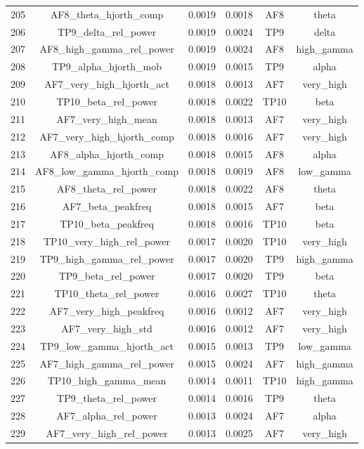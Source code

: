 \begin{table}[hptb]
\begin{table}
\begin{tabular}{cccccc}
205 & AF8_theta_hjorth_comp & 0.0019 & 0.0018 & AF8 & theta \\
206 & TP9_delta_rel_power & 0.0019 & 0.0024 & TP9 & delta \\
207 & AF8_high_gamma_rel_power & 0.0019 & 0.0024 & AF8 & high_gamma \\
208 & TP9_alpha_hjorth_mob & 0.0019 & 0.0015 & TP9 & alpha \\
209 & AF7_very_high_hjorth_act & 0.0018 & 0.0013 & AF7 & very_high \\
210 & TP10_beta_rel_power & 0.0018 & 0.0022 & TP10 & beta \\
211 & AF7_very_high_mean & 0.0018 & 0.0013 & AF7 & very_high \\
212 & AF7_very_high_hjorth_comp & 0.0018 & 0.0016 & AF7 & very_high \\
213 & AF8_alpha_hjorth_comp & 0.0018 & 0.0015 & AF8 & alpha \\
214 & AF8_low_gamma_hjorth_comp & 0.0018 & 0.0019 & AF8 & low_gamma \\
215 & AF8_theta_rel_power & 0.0018 & 0.0022 & AF8 & theta \\
216 & AF7_beta_peakfreq & 0.0018 & 0.0015 & AF7 & beta \\
217 & TP10_beta_peakfreq & 0.0018 & 0.0016 & TP10 & beta \\
218 & TP10_very_high_rel_power & 0.0017 & 0.0020 & TP10 & very_high \\
219 & TP9_high_gamma_rel_power & 0.0017 & 0.0020 & TP9 & high_gamma \\
220 & TP9_beta_rel_power & 0.0017 & 0.0020 & TP9 & beta \\
221 & TP10_theta_rel_power & 0.0016 & 0.0027 & TP10 & theta \\
222 & AF7_very_high_peakfreq & 0.0016 & 0.0012 & AF7 & very_high \\
223 & AF7_very_high_std & 0.0016 & 0.0012 & AF7 & very_high \\
224 & TP9_low_gamma_hjorth_act & 0.0015 & 0.0013 & TP9 & low_gamma \\
225 & AF7_high_gamma_rel_power & 0.0015 & 0.0024 & AF7 & high_gamma \\
226 & TP10_high_gamma_mean & 0.0014 & 0.0011 & TP10 & high_gamma \\
227 & TP9_theta_rel_power & 0.0014 & 0.0016 & TP9 & theta \\
228 & AF7_alpha_rel_power & 0.0013 & 0.0024 & AF7 & alpha \\
229 & AF7_very_high_rel_power & 0.0013 & 0.0025 & AF7 & very_high \\

\end{tabular}
\end{table}
\end{table}
